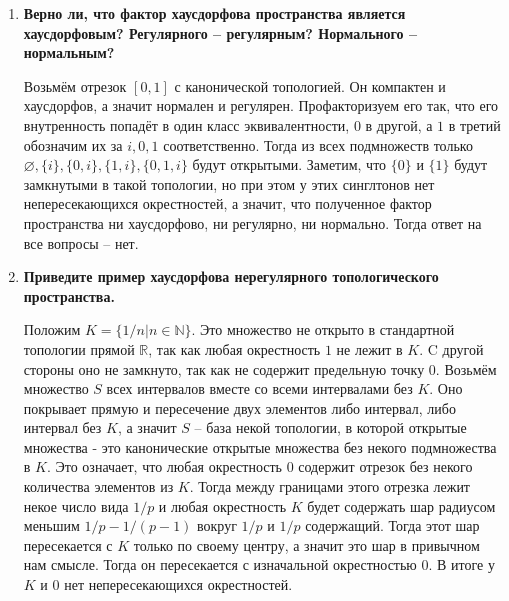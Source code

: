 \documentclass{article}
\begin{document}
\begin{enumerate}
        Отображение f непрерывно, так как непрерывна каждая композиция $pr_i
        \circ f$. Отображение f построено так, что оно делит шар на сферы. Для
        $r\in[0,1/4)$ сферы этих радиусов по возрастающи устилают основания,
        затем для $r\in[1/4,3/4]$ устилают боковые грани, а для $r\in(3/4,1]$
        устилают верхнее основание, причем окружность при приближении к
        границе диска стягивается в точку, а сама граница переходит в середину
        верхней грани. По этому это отображение после факторизации диска
        становится биекцией. До факторизации открытыми множествами диска были
        всевозможные пересечения диска с открытыми объемлющего пространства,
        после факторизации, если открытое не содержало точек границы, то оно
        так и  останется открытым, так как его прообраз он сам. Если некое
        открытое множество профакторезованного диска содержит класс границы,
        то его прообара...

    \item \textbf{Верно ли, что фактор хаусдорфова пространства является
        хаусдорфовым? Регулярного – регулярным? Нормального – нормальным?}\par
        Возьмём отрезок $[0,1]$ с канонической топологией. Он компактен и
        хаусдорфов, а значит нормален и регулярен. Профакторизуем его так, что
        его внутренность попадёт в один класс эквивалентности, $0$ в другой,
        а $1$ в третий обозначим их за $i,0,1$ соответственно. Тогда из всех
        подмножеств только $\varnothing, \{i\},\{0, i\},\{1,i\},\{0,1,i\}$
        будут открытыми. Заметим, что  $\{0\}$ и $\{1\}$ будут замкнутыми в
        такой топологии, но при этом у этих синглтонов нет непересекающихся
        окрестностей, а значит, что полученное фактор пространства ни
        хаусдорфово, ни регулярно, ни нормально. Тогда ответ на все вопросы – нет.

    \item \textbf{Приведите пример хаусдорфова нерегулярного топологического
        пространства.}\par
        Положим $K=\{1/n|n\in\mathbb{N}\}$. Это множество не открыто в
        стандартной топологии прямой $\mathbb{R}$, так как любая окрестность
        $1$ не лежит в $K$. C другой стороны оно не замкнуто, так как не
        содержит предельную точку $0$. Возьмём множество $S$ всех
        интервалов вместе со всеми интервалами без $K$. Оно покрывает прямую и
        пересечение двух элементов либо интервал, либо интервал без $K$, а
        значит $S$ – база некой топологии, в которой открытые множества - это
        канонические открытые множества без некого подмножества в $K$. Это
        означает, что любая окрестность $0$ содержит отрезок без некого
        количества элементов из $K$. Тогда между границами этого отрезка лежит
        некое число вида $1/p$ и любая окрестность $K$ будет содержать шар
        радиусом меньшим $1/p-1/(p-1)$ вокруг $1/p$ и $1/p$ содержащий. Тогда
        этот шар пересекается с $K$ только по своему центру, а значит это
        шар в привычном нам смысле. Тогда он пересекается с изначальной
        окрестностью $0$. В итоге у $K$ и $0$ нет непересекающихся окрестностей.


\end{enumerate}
\end{document}
